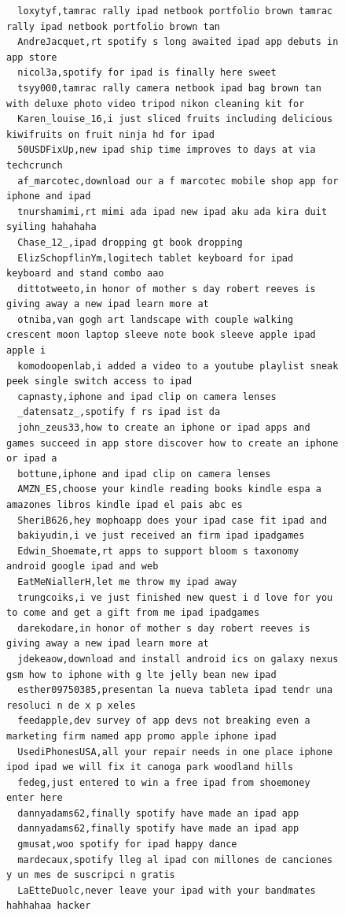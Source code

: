 \begin{figure}[htpb]
\begin{verbatim}
  loxytyf,tamrac rally ipad netbook portfolio brown tamrac rally ipad netbook portfolio brown tan
  AndreJacquet,rt spotify s long awaited ipad app debuts in app store
  nicol3a,spotify for ipad is finally here sweet
  tsyy000,tamrac rally camera netbook ipad bag brown tan with deluxe photo video tripod nikon cleaning kit for
  Karen_louise_16,i just sliced fruits including delicious kiwifruits on fruit ninja hd for ipad
  50USDFixUp,new ipad ship time improves to days at via techcrunch
  af_marcotec,download our a f marcotec mobile shop app for iphone and ipad
  tnurshamimi,rt mimi ada ipad new ipad aku ada kira duit syiling hahahaha
  Chase_12_,ipad dropping gt book dropping
  ElizSchopflinYm,logitech tablet keyboard for ipad keyboard and stand combo aao
  dittotweeto,in honor of mother s day robert reeves is giving away a new ipad learn more at
  otniba,van gogh art landscape with couple walking crescent moon laptop sleeve note book sleeve apple ipad apple i
  komodoopenlab,i added a video to a youtube playlist sneak peek single switch access to ipad
  capnasty,iphone and ipad clip on camera lenses
  _datensatz_,spotify f rs ipad ist da
  john_zeus33,how to create an iphone or ipad apps and games succeed in app store discover how to create an iphone or ipad a
  bottune,iphone and ipad clip on camera lenses
  AMZN_ES,choose your kindle reading books kindle espa a amazones libros kindle ipad el pais abc es
  SheriB626,hey mophoapp does your ipad case fit ipad and
  bakiyudin,i ve just received an firm ipad ipadgames
  Edwin_Shoemate,rt apps to support bloom s taxonomy android google ipad and web
  EatMeNiallerH,let me throw my ipad away
  trungcoiks,i ve just finished new quest i d love for you to come and get a gift from me ipad ipadgames
  darekodare,in honor of mother s day robert reeves is giving away a new ipad learn more at
  jdekeaow,download and install android ics on galaxy nexus gsm how to iphone with g lte jelly bean new ipad
  esther09750385,presentan la nueva tableta ipad tendr una resoluci n de x p xeles
  feedapple,dev survey of app devs not breaking even a marketing firm named app promo apple iphone ipad
  UsediPhonesUSA,all your repair needs in one place iphone ipod ipad we will fix it canoga park woodland hills
  fedeg,just entered to win a free ipad from shoemoney enter here
  dannyadams62,finally spotify have made an ipad app
  dannyadams62,finally spotify have made an ipad app
  gmusat,woo spotify for ipad happy dance
  mardecaux,spotify lleg al ipad con millones de canciones y un mes de suscripci n gratis
  LaEtteDuolc,never leave your ipad with your bandmates hahhahaa hacker

\end{verbatim}
\end{figure}

